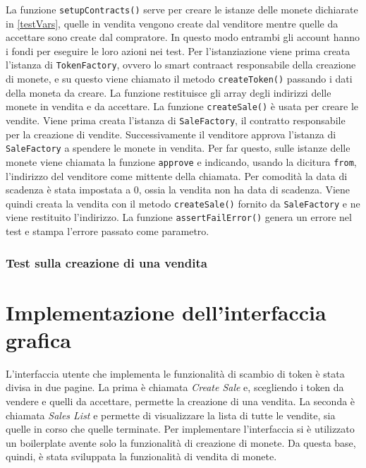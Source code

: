 \documentclass[a4paper]{article}
\begin{document}
        La funzione \verb|setupContracts()| serve per creare le istanze delle monete dichiarate in \ref{testVars}, quelle in vendita vengono create dal venditore mentre quelle da accettare sono create dal compratore.
        In questo modo entrambi gli account hanno i fondi per eseguire le loro azioni nei test. Per l'istanziazione viene prima creata l'istanza di \verb|TokenFactory|, ovvero lo smart contraact responsabile della creazione di monete,
        e su questo viene chiamato il metodo \verb|createToken()| passando i dati della moneta da creare. La funzione restituisce gli array degli indirizzi delle monete in vendita e da accettare.
        \newline
        La funzione \verb|createSale()| è usata per creare le vendite. Viene prima creata l'istanza di \verb|SaleFactory|, il contratto responsabile per la creazione di vendite. Successivamente il venditore approva l'istanza di \verb|SaleFactory| a spendere le monete in vendita.
        Per far questo, sulle istanze delle monete viene chiamata la funzione \verb|approve| e indicando, usando la dicitura \verb|from|, l'indirizzo del venditore come mittente della chiamata. Per comodità la data di scadenza è stata impostata a 0, ossia la vendita non ha data di scadenza.
        Viene quindi creata la vendita con il metodo \verb|createSale()| fornito da \verb|SaleFactory| e ne viene restituito l'indirizzo.
        \newline
        La funzione \verb|assertFailError()| genera un errore nel test e stampa l'errore passato come parametro.
        \subsubsection{Test sulla creazione di una vendita}

        \newpage
        \section{Implementazione dell'interfaccia grafica}
        L'interfaccia utente che implementa le funzionalità di scambio di token è stata divisa in due pagine.
        La prima è chiamata \emph{Create Sale} e, scegliendo i token da vendere e quelli da accettare, permette
        la creazione di una vendita. La seconda è chiamata \emph{Sales List} e permette di visualizzare la lista di tutte le vendite, sia quelle in corso
        che quelle terminate.
        \newline
        Per implementare l'interfaccia si è utilizzato un boilerplate avente solo la funzionalità di creazione di monete\cite{boilerplate}. Da questa base, quindi, è stata sviluppata la funzionalità di vendita di monete. 
\end{document}
